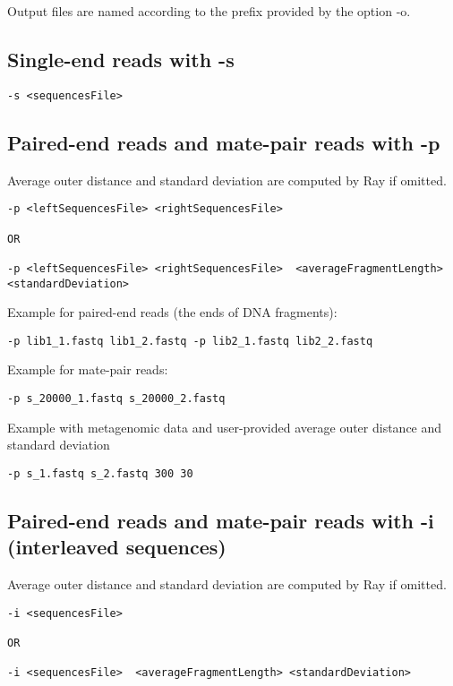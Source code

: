 \documentclass{article}
\begin{document}
Output files are named according to the prefix provided by the option -o.

\subsection{Single-end reads with -s}

\begin{verbatim}
-s <sequencesFile>
\end{verbatim}

\subsection{Paired-end reads and mate-pair reads with -p}

Average outer distance and standard deviation are computed by Ray if omitted.

\begin{verbatim}
-p <leftSequencesFile> <rightSequencesFile>  

OR

-p <leftSequencesFile> <rightSequencesFile>  <averageFragmentLength> <standardDeviation> 
\end{verbatim}

Example for paired-end reads (the ends of DNA fragments):

\begin{verbatim}
-p lib1_1.fastq lib1_2.fastq -p lib2_1.fastq lib2_2.fastq
\end{verbatim}

Example for mate-pair reads:

\begin{verbatim}
-p s_20000_1.fastq s_20000_2.fastq
\end{verbatim}

Example with metagenomic data and user-provided average outer distance and standard deviation

\begin{verbatim}
-p s_1.fastq s_2.fastq 300 30
\end{verbatim}

\subsection{Paired-end reads and mate-pair reads with -i (interleaved sequences)}


Average outer distance and standard deviation are computed by Ray if omitted.

\begin{verbatim}
-i <sequencesFile>

OR

-i <sequencesFile>  <averageFragmentLength> <standardDeviation> 
\end{verbatim}
\end{document}
